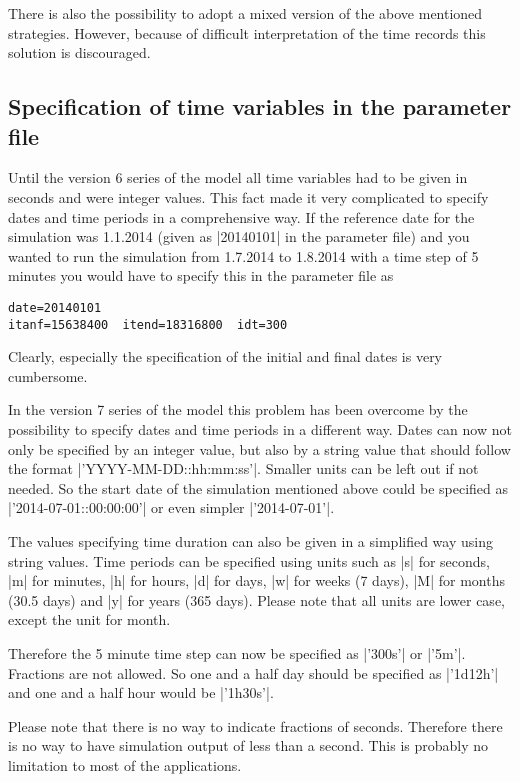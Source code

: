 \documentclass[12pt,draft]{article}
\begin{document}
There is also the possibility to adopt a mixed version of the
above mentioned strategies. However, because of difficult
interpretation of the time records this solution is discouraged.

\subsection{Specification of time variables in the parameter file}

Until the version 6 series of the model all time variables had
to be given in seconds and were integer values. This fact
made it very complicated to specify dates and time periods
in a comprehensive way. If the reference date for the
simulation was 1.1.2014 (given as |20140101| in the parameter file)
and you wanted to run the simulation from 1.7.2014 to 1.8.2014
with a time step of 5 minutes
you would have to specify this in the parameter file as
\begin{verbatim}
date=20140101  
itanf=15638400  itend=18316800  idt=300
\end{verbatim}
Clearly, especially
the specification of the initial and final dates is very cumbersome.

In the version 7 series of the model this problem has been
overcome by the possibility to specify dates and time periods in
a different way. Dates can now not only be specified by 
an integer value, but also by a string value that should
follow the format |'YYYY-MM-DD::hh:mm:ss'|. Smaller units can 
be left out if not needed. So the start date of the simulation
mentioned above could be specified as |'2014-07-01::00:00:00'|
or even simpler |'2014-07-01'|.

The values specifying time duration can also be given in
a simplified way using string values. Time periods can be
specified using units such as |s| for seconds, |m| for minutes,
|h| for hours, |d| for days, |w| for weeks (7 days), |M| for 
months (30.5 days) and |y| for years (365 days). Please note 
that all units are lower case, except the unit for month.

Therefore the 5 minute time step can now be specified
as |'300s'| or |'5m'|. Fractions are not allowed. So one and a half
day should be specified as |'1d12h'| and one and a half hour
would be |'1h30s'|.

Please note that there is no way to indicate fractions of
seconds. Therefore there is no way to have simulation output
of less than a second. This is probably no limitation to most of
the applications.
\end{document}
